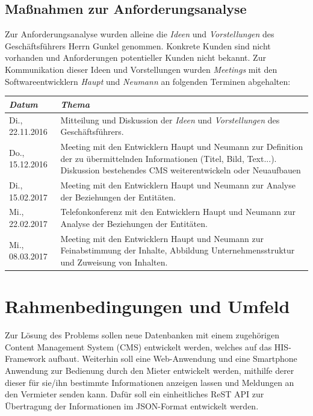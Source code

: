 \documentclass[a4paper]{article}
\begin{document}
	\subsection{Maßnahmen zur Anforderungsanalyse}
	Zur Anforderungsanalyse wurden alleine die \emph{Ideen} und \emph{Vorstellungen} des Geschäftsführers Herrn Gunkel genommen.
	Konkrete Kunden sind nicht vorhanden und Anforderungen potentieller Kunden nicht bekannt.
	Zur Kommunikation dieser Ideen und Vorstellungen wurden \emph{Meetings} mit den Softwareentwicklern \emph{Haupt} und \emph{Neumann} an folgenden Terminen abgehalten:
	\begin{center}
		\begin{tabular}{|p{}|p{}|}
			\hline
			\emph{Datum} & \emph{Thema} \\
			\hline
			Di., 22.11.2016 & Mitteilung und Diskussion der \emph{Ideen} und \emph{Vorstellungen} des Geschäftsführers. \\
			\hline
			Do., 15.12.2016 &Meeting mit den Entwicklern Haupt und Neumann zur Definition der zu übermittelnden Informationen (Titel, Bild, Text...).
       		Diskussion bestehendes CMS weiterentwickeln oder Neuaufbauen
			\\
			\hline
			Di., 15.02.2017 & Meeting mit den Entwicklern Haupt und Neumann zur Analyse der Beziehungen der Entitäten. \\
			\hline
			Mi., 22.02.2017 & Telefonkonferenz mit den Entwicklern Haupt und Neumann zur Analyse der Beziehungen der Entitäten. \\
			\hline
			Mi., 08.03.2017 & Meeting mit den Entwicklern Haupt und Neumann zur Feinabstimmung der Inhalte, Abbildung Unternehmensstruktur und Zuweisung von Inhalten. \\
			\hline	
		\end{tabular}
	\end{center}
	
	\pagebreak
	\section{Rahmenbedingungen und Umfeld}
	Zur Lösung des Problems sollen neue Datenbanken mit einem zugehörigen Content Management System (CMS) entwickelt werden, welches auf das HIS-Framework aufbaut.
	Weiterhin soll eine Web-Anwendung und eine Smartphone Anwendung zur Bedienung durch den Mieter entwickelt werden, mithilfe derer dieser für sie/ihn bestimmte Informationen anzeigen lassen und Meldungen an den Vermieter senden kann.	
	Dafür soll ein einheitliches ReST API zur Übertragung der Informationen im JSON-Format entwickelt werden.
\end{document}
